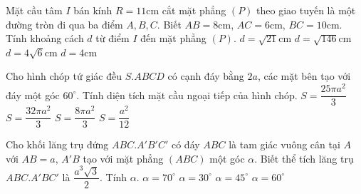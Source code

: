 \begin{ex}%
	Mặt cầu tâm $I$ bán kính $R=11$cm cắt mặt phẳng $(P)$ theo giao tuyến là một đường tròn đi qua ba điểm $A, B, C$. Biết $AB=8$cm, $AC=6$cm, $BC=10$cm. Tính khoảng cách $d$ từ điểm $I$ đến mặt phẳng $(P)$.
	\choice
	{$d=\sqrt{21}$cm}
	{$d=\sqrt{146}$cm}
	{\True $d=4\sqrt{6}$cm}
	{$d=4$cm}
\end{ex}

\begin{ex}%
	Cho hình chóp tứ giác đều $S.ABCD$ có cạnh đáy bằng $2a$, các mặt bên tạo với đáy một góc $60^\circ$. Tính diện tích mặt cầu  ngoại tiếp của hình chóp.
	\choice
	{\True $S=\dfrac{25\pi a^2}{3}$}
	{$S=\dfrac{32 \pi a^2}{3}$}
	{$S=\dfrac{8 \pi a^2}{3}$}
	{$S=\dfrac{a^2}{12}$}
\end{ex}

\begin{ex}%
	Cho khối lăng trụ đứng $ABC. A'B'C'$ có đáy $ABC$ là tam giác vuông cân tại $A$ với $AB=a$, $A'B$ tạo với mặt phẳng $(ABC)$ một góc $\alpha$. Biết thể tích lăng trụ $ABC.A'BC'$ là $\dfrac{a^3 \sqrt 3}{2}$. Tính $\alpha$.
	\choice
	{$\alpha =70^\circ$}
	{$\alpha=30^\circ$}
	{$\alpha=45^\circ$}
	{\True $\alpha=60^\circ$}	
\end{ex}

